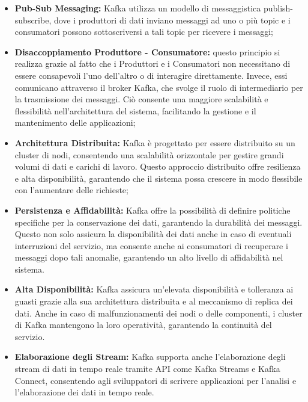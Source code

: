 \begin{itemize}
  \item \textbf{Pub-Sub Messaging:} Kafka utilizza un modello di messaggistica publish-subscribe, dove i produttori di dati inviano messaggi ad uno o più topic e i consumatori possono sottoscriversi a tali topic per ricevere i messaggi;
  
  \item \textbf{Disaccoppiamento Produttore - Consumatore:} questo principio si realizza grazie al fatto che i Produttori e i Consumatori non necessitano di essere consapevoli l'uno dell'altro o di interagire direttamente. Invece, essi comunicano attraverso il broker Kafka, che svolge il ruolo di intermediario per la trasmissione dei messaggi. Ciò consente una maggiore scalabilità e flessibilità nell'architettura del sistema, facilitando la gestione e il mantenimento delle applicazioni;
  
  \item \textbf{Architettura Distribuita:} Kafka è progettato per essere distribuito su un cluster di nodi, consentendo una scalabilità orizzontale per gestire grandi volumi di dati e carichi di lavoro. Questo approccio distribuito offre resilienza e alta disponibilità, garantendo che il sistema possa crescere in modo flessibile con l'aumentare delle richieste;
  
  \item \textbf{Persistenza e Affidabilità:} Kafka offre la possibilità di definire politiche specifiche per la conservazione dei dati, garantendo la durabilità dei messaggi. Questo non solo assicura la disponibilità dei dati anche in caso di eventuali interruzioni del servizio, ma consente anche ai consumatori di recuperare i messaggi dopo tali anomalie, garantendo un alto livello di affidabilità nel sistema.
  
  \item \textbf{Alta Disponibilità:} Kafka assicura un'elevata disponibilità e tolleranza ai guasti grazie alla sua architettura distribuita e al meccanismo di replica dei dati. Anche in caso di malfunzionamenti dei nodi o delle componenti, i cluster di Kafka mantengono la loro operatività, garantendo la continuità del servizio.
  
  \item \textbf{Elaborazione degli Stream:} Kafka supporta anche l'elaborazione degli stream di dati in tempo reale tramite API come Kafka Streams e Kafka Connect, consentendo agli sviluppatori di scrivere applicazioni per l'analisi e l'elaborazione dei dati in tempo reale.
\end{itemize}

